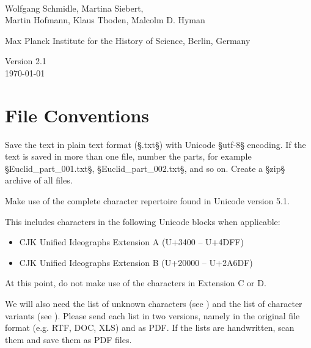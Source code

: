 \documentclass[fontsize=11pt, paper=a4, 
DIV15,
headings=normal,
parskip=half-, 
numbers=noenddot]{scrartcl}
\begin{document}
\begin{center}
{} \\[5mm]
\large Wolfgang Schmidle, Martina Siebert, \\[1mm] 
Martin Hofmann, Klaus Thoden, Malcolm D. Hyman

\normalsize Max Planck Institute for the History of Science, Berlin, Germany

Version 2.1 \\[1mm]
\today
\end{center}

\tableofcontents

\newpage

\section{File Conventions}
\label{section file conventions}

\begin{mainrule}
Save the text in plain text format (§.txt§) with Unicode §utf-8§ encoding. If the text is saved in more than one file, number the parts, for example §Euclid_part_001.txt§, §Euclid_part_002.txt§, and so on. Create a §zip§ archive of all files.
\end{mainrule}

\begin{mainrule}
Make use of the complete character repertoire found in Unicode version 5.1.
\end{mainrule}

\begin{clarification}
This includes characters in the following Unicode blocks when applicable: 

\begin{itemize}
\item CJK Unified Ideographs Extension A (U+3400 -- U+4DFF)
\item CJK Unified Ideographs Extension B (U+20000 -- U+2A6DF)
\end{itemize}
At this point, do not make use of the characters in Extension C or D.
\end{clarification}

\begin{mainrule}
We will also need the list of unknown characters (see ) and the list of character variants (see ). Please send each list in two versions, namely in the original file format (e.g. RTF, DOC, XLS) and as PDF. If the lists are handwritten, scan them and save them as PDF files. 
\end{mainrule}
\end{document}
